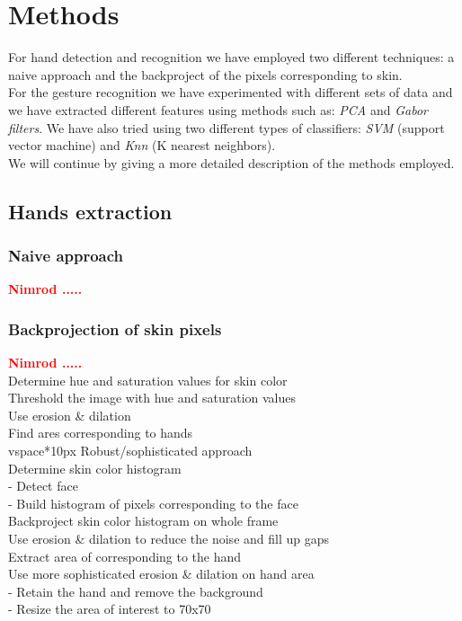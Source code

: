 \documentclass[a4paper, 11pt, twocolumn]{article}
\newcommand{\todo}[1]{\textcolor{red}{\textbf{#1}}}
\begin{document}
    \section{Methods}
	\label{sec:methods}
		For hand detection and recognition we have employed two different techniques: a naive approach and the backproject of the pixels corresponding to skin.\\
		\hspace*{10px}For the gesture recognition we have experimented with different sets of data and we have extracted different features using methods such as: \emph{PCA} and \emph{Gabor filters}. We have also tried using two different types of classifiers: \emph{SVM} (support vector machine) and \emph{Knn} (K nearest neighbors).\\
		\hspace*{10px}We will continue by giving a more detailed description of the methods employed. 
        \subsection{Hands extraction}
		\label{sec:Meth_exrctHands}
        \subsubsection{Naive approach}
		\todo{Nimrod .....}\\

        \subsubsection{Backprojection of skin pixels}
        \todo{Nimrod .....}\\
        Determine hue and saturation values for skin color\\
        Threshold the image with hue and saturation values\\
        Use erosion \& dilation\\
        Find ares corresponding to hands\\
        vspace*{10px}
        Robust/sophisticated approach\\
        Determine skin color histogram\\
        - Detect face\\
        - Build histogram of pixels corresponding to the face\\
        Backproject skin color histogram on whole frame\\
        Use erosion \& dilation to reduce the noise and fill up gaps\\
        Extract area of corresponding to the hand\\
        Use more sophisticated erosion \& dilation on hand area\\
        - Retain the hand and remove the background\\
        - Resize the area of interest to 70x70
\end{document}
